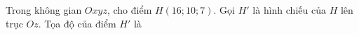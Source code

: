 \begin{ex}
Trong không gian $Oxyz$, cho điểm $H(16;10;7)$. Gọi $H'$ là hình chiếu của $H$ lên trục $Oz$. Tọa độ của điểm $H'$ là
\end{ex}
